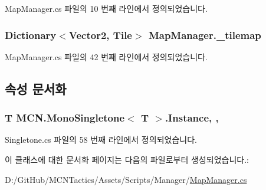 Map\+Manager.\+cs 파일의 10 번째 라인에서 정의되었습니다.

\subsubsection[{\texorpdfstring{\+\_\+tilemap}{_tilemap}}]{\setlength{\rightskip}{0pt plus 5cm}Dictionary$<$Vector2, {\bf Tile}$>$ Map\+Manager.\+\_\+tilemap\hspace{0.3cm}{\ttfamily [private]}}\hypertarget{class_map_manager_a58f7635d8e19795f3845a3f85e2b4ac3}{}\label{class_map_manager_a58f7635d8e19795f3845a3f85e2b4ac3}


Map\+Manager.\+cs 파일의 42 번째 라인에서 정의되었습니다.



\subsection{속성 문서화}
\subsubsection[{\texorpdfstring{Instance}{Instance}}]{\setlength{\rightskip}{0pt plus 5cm}T {\bf M\+C\+N.\+Mono\+Singletone}$<$ T $>$.Instance\hspace{0.3cm}{\ttfamily [static]}, {\ttfamily [get]}, {\ttfamily [inherited]}}\hypertarget{class_m_c_n_1_1_mono_singletone_aa50c027cca64cf4ad30c1ee5c83e0b78}{}\label{class_m_c_n_1_1_mono_singletone_aa50c027cca64cf4ad30c1ee5c83e0b78}


Singletone.\+cs 파일의 58 번째 라인에서 정의되었습니다.



이 클래스에 대한 문서화 페이지는 다음의 파일로부터 생성되었습니다.\+:\begin{DoxyCompactItemize}
\item 
D\+:/\+Git\+Hub/\+M\+C\+N\+Tactics/\+Assets/\+Scripts/\+Manager/\hyperlink{_map_manager_8cs}{Map\+Manager.\+cs}\end{DoxyCompactItemize}

